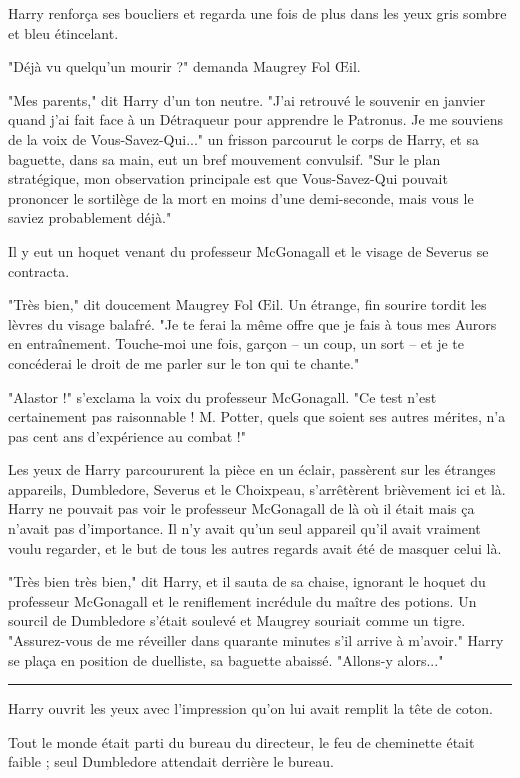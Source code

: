 Harry renforça ses boucliers et regarda une fois de plus dans les yeux gris sombre et bleu étincelant.

"Déjà vu quelqu'un mourir ?" demanda Maugrey Fol Œil.

"Mes parents," dit Harry d'un ton neutre. "J'ai retrouvé le souvenir en janvier quand j'ai fait face à un Détraqueur pour apprendre le Patronus. Je me souviens de la voix de Vous-Savez-Qui..." un frisson parcourut le corps de Harry, et sa baguette, dans sa main, eut un bref mouvement convulsif. "Sur le plan stratégique, mon observation principale est que Vous-Savez-Qui pouvait prononcer le sortilège de la mort en moins d'une demi-seconde, mais vous le saviez probablement déjà."

Il y eut un hoquet venant du professeur McGonagall et le visage de Severus se contracta.

"Très bien," dit doucement Maugrey Fol Œil. Un étrange, fin sourire tordit les lèvres du visage balafré. "Je te ferai la même offre que je fais à tous mes Aurors en entraînement. Touche-moi une fois, garçon – un coup, un sort – et je te concéderai le droit de me parler sur le ton qui te chante."

"Alastor !" s'exclama la voix du professeur McGonagall. "Ce test n'est certainement pas raisonnable ! M. Potter, quels que soient ses autres mérites, n'a pas cent ans d'expérience au combat !"

Les yeux de Harry parcoururent la pièce en un éclair, passèrent sur les étranges appareils, Dumbledore, Severus et le Choixpeau, s'arrêtèrent brièvement ici et là. Harry ne pouvait pas voir le professeur McGonagall de là où il était mais ça n'avait pas d'importance. Il n'y avait qu'un seul appareil qu'il avait vraiment voulu regarder, et le but de tous les autres regards avait été de masquer celui là.

"Très bien très bien," dit Harry, et il sauta de sa chaise, ignorant le hoquet du professeur McGonagall et le reniflement incrédule du maître des potions. Un sourcil de Dumbledore s'était soulevé et Maugrey souriait comme un tigre. "Assurez-vous de me réveiller dans quarante minutes s'il arrive à m'avoir." Harry se plaça en position de duelliste, sa baguette abaissé. "Allons-y alors..."
\par\noindent\rule{\textwidth}{0.4pt}
Harry ouvrit les yeux avec l'impression qu'on lui avait remplit la tête de coton.

Tout le monde était parti du bureau du directeur, le feu de cheminette était faible ; seul Dumbledore attendait derrière le bureau.

